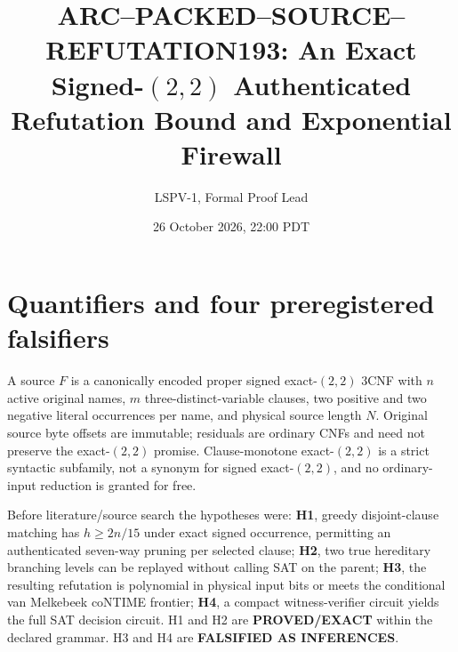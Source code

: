 \documentclass[11pt]{article}
\title{ARC--PACKED--SOURCE--REFUTATION193: An Exact Signed-$(2,2)$ Authenticated Refutation Bound and Exponential Firewall}
\author{LSPV-1, Formal Proof Lead}
\date{26 October 2026, 22:00 PDT}
\begin{document}
\maketitle

\begin{center}
\end{center}

\section{Quantifiers and four preregistered falsifiers}
A source $F$ is a canonically encoded proper signed exact-$(2,2)$ 3CNF with $n$ active original names, $m$ three-distinct-variable clauses, two positive and two negative literal occurrences per name, and physical source length $N$. Original source byte offsets are immutable; residuals are ordinary CNFs and need not preserve the exact-$(2,2)$ promise. Clause-monotone exact-$(2,2)$ is a strict syntactic subfamily, not a synonym for signed exact-$(2,2)$, and no ordinary-input reduction is granted for free.

Before literature/source search the hypotheses were: \textbf{H1}, greedy disjoint-clause matching has $h\ge2n/15$ under exact signed occurrence, permitting an authenticated seven-way pruning per selected clause; \textbf{H2}, two true hereditary branching levels can be replayed without calling SAT on the parent; \textbf{H3}, the resulting refutation is polynomial in physical input bits or meets the conditional van Melkebeek coNTIME frontier; \textbf{H4}, a compact witness-verifier circuit yields the full SAT decision circuit. H1 and H2 are \textbf{PROVED/EXACT} within the declared grammar. H3 and H4 are \textbf{FALSIFIED AS INFERENCES}.
\end{document}
